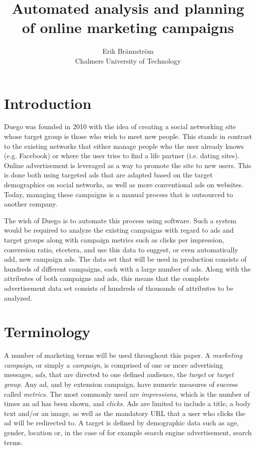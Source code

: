 \documentclass[a4paper]{article}
\begin{document}
\title{Automated analysis and planning of online marketing campaigns}
\author{Erik Brännström\\
  Chalmers University of Technology}
\date{}
\maketitle

\section{Introduction}
Duego was founded in 2010 with the idea of creating a social networking site whose target group is those who wish to meet new
people. This stands in contrast to the existing networks that either manage people who the user already knows (e.g. Facebook)
or where the user tries to find a life partner (i.e. dating sites). Online advertisement is leveraged as a way to promote the
site to new users. This is done both using targeted ads that are adapted based on the target demographics on social networks,
as well as more conventional ads on websites. Today, managing these campaigns is a manual process that is outsourced to
another company.

The wish of Duego is to automate this process using software. Such a system would be required to analyze the existing campaigns
with regard to ads and target groups along with campaign metrics such as clicks per impression, conversion ratio, etcetera, and
use this data to suggest, or even automatically add, new campaign ads. The data set that will be used in production consists of
hundreds of different campaigns, each with a large number of ads. Along with the attributes of both campaigns and ads, this means
that the complete advertisement data set consists of hundreds of thousands of attributes to be analyzed.

\section{Terminology}
A number of marketing terms will be used throughout this paper. A \emph{marketing campaign}, or simply a \emph{campaign},
is comprised of one or more advertising messages, \emph{ads}, that are directed to one defined audience, the \emph{target} or 
\emph{target group}. Any ad, and by extension campaign, have numeric measures of success called \emph{metrics}. The most commonly
used are \emph{impressions}, which is the number of times an ad has been shown, and \emph{clicks}. Ads are limited to include a 
title, a body text and/or an image, as well as the mandatory URL that a user who clicks the ad will be redirected to. A target
is defined by demographic data such as age, gender, location or, in the case of for example search engine advertisement, search
terms.
\end{document}
